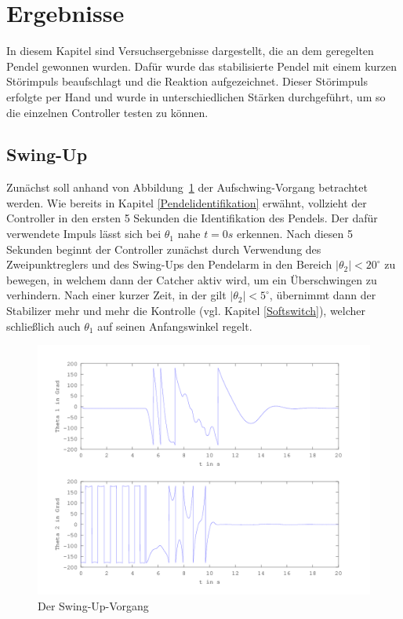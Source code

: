 \section{Ergebnisse}
In diesem Kapitel sind Versuchsergebnisse dargestellt, die an dem geregelten Pendel gewonnen wurden. Dafür wurde das stabilisierte Pendel mit einem kurzen Störimpuls beaufschlagt und die Reaktion aufgezeichnet. Dieser Störimpuls erfolgte per Hand und wurde in unterschiedlichen Stärken durchgeführt, um so die einzelnen Controller testen zu können. 
\subsection{Swing-Up}
Zunächst soll anhand von Abbildung~\ref{fig.Swing-Up-Plot} der Aufschwing-Vorgang betrachtet werden. Wie bereits in Kapitel \ref{Pendelidentifikation} erwähnt, vollzieht der Controller in den ersten 5 Sekunden die Identifikation des Pendels. Der dafür verwendete Impuls lässt sich bei $\theta_1$ nahe $t=0s$ erkennen. Nach diesen 5 Sekunden beginnt der Controller zunächst durch Verwendung des Zweipunktreglers und des Swing-Ups den Pendelarm in den Bereich $\left| \theta_2 \right| < 20^\circ$ zu bewegen, in welchem dann der Catcher aktiv wird, um ein Überschwingen zu verhindern. Nach einer kurzer Zeit, in der gilt $\left| \theta_2 \right| < 5^\circ$, übernimmt dann der Stabilizer mehr und mehr die Kontrolle (vgl. Kapitel \ref{Softswitch}), welcher schließlich auch $\theta_1$ auf seinen Anfangswinkel regelt.

\begin{figure}[htbp]
	\centering
	\includegraphics[width=1.\textwidth]{Grafiken/Swingup_kurz.png}
	\caption{Der Swing-Up-Vorgang}
	\label{fig.Swing-Up-Plot}
\end{figure}


